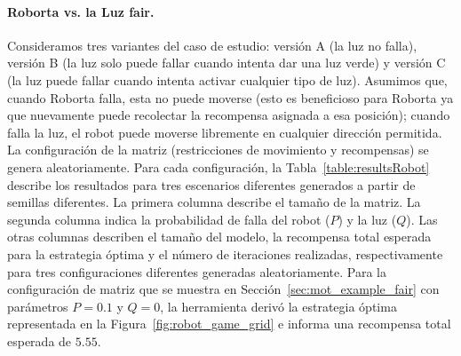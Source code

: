 \paragraph{Roborta vs. la Luz fair.}
Consideramos tres variantes del caso de estudio: versión A (la luz no falla), versión B (la luz solo puede fallar cuando intenta dar una luz verde) y versión C (la luz puede fallar cuando intenta activar cualquier tipo de luz).
Asumimos que, cuando Roborta falla, esta no puede moverse (esto es beneficioso para Roborta ya que nuevamente puede recolectar la recompensa asignada a esa posición);
cuando falla la luz, el robot puede moverse libremente en cualquier dirección permitida.
La configuración de la matriz (restricciones de movimiento y recompensas) se genera aleatoriamente. Para cada configuración, la Tabla~\ref{table:resultsRobot} describe los resultados para tres escenarios diferentes generados a partir de semillas diferentes. La primera columna describe el tamaño de la matriz. La segunda columna indica la probabilidad de falla del robot ($P$) y la luz ($Q$).
Las otras columnas describen el tamaño del modelo, la recompensa total esperada para la estrategia óptima y el número de iteraciones realizadas, respectivamente para tres configuraciones diferentes generadas aleatoriamente.
Para la configuración de matriz que se muestra en Sección~\ref{sec:mot_example_fair} con parámetros $P=0.1$ y $Q=0$, la herramienta derivó la estrategia óptima representada en la Figura~\ref{fig:robot_game_grid} e informa una recompensa total esperada de $5.55$.



